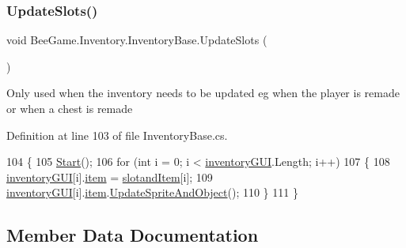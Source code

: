 \subsubsection{\texorpdfstring{Update\+Slots()}{UpdateSlots()}}
{\footnotesize\ttfamily void Bee\+Game.\+Inventory.\+Inventory\+Base.\+Update\+Slots (\begin{DoxyParamCaption}{ }\end{DoxyParamCaption})}



Only used when the inventory needs to be updated eg when the player is remade or when a chest is remade 



Definition at line 103 of file Inventory\+Base.\+cs.


\begin{DoxyCode}
104         \{
105             \hyperlink{class_bee_game_1_1_inventory_1_1_inventory_base_a22d2b2a1621c8cf19925692ac8cc5923}{Start}();
106             \textcolor{keywordflow}{for} (\textcolor{keywordtype}{int} i = 0; i < \hyperlink{class_bee_game_1_1_inventory_1_1_inventory_base_a48dcba7ad7bfa1bed8c9ae290fb32857}{inventoryGUI}.Length; i++)
107             \{
108                 \hyperlink{class_bee_game_1_1_inventory_1_1_inventory_base_a48dcba7ad7bfa1bed8c9ae290fb32857}{inventoryGUI}[i].\hyperlink{class_bee_game_1_1_inventory_1_1_inventory_slot_a31b201e7eef9ed0001a447b3f76a7a81}{item} = \hyperlink{class_bee_game_1_1_inventory_1_1_inventory_base_a405502a6eabf14e1498d96dc8aff5e8d}{slotandItem}[i];
109                 \hyperlink{class_bee_game_1_1_inventory_1_1_inventory_base_a48dcba7ad7bfa1bed8c9ae290fb32857}{inventoryGUI}[i].\hyperlink{class_bee_game_1_1_inventory_1_1_inventory_slot_a31b201e7eef9ed0001a447b3f76a7a81}{item}.\hyperlink{struct_bee_game_1_1_items_1_1_item_a29abdb5010a23262e7562720bb85c171}{UpdateSpriteAndObject}();
110             \}
111         \}
\end{DoxyCode}


\subsection{Member Data Documentation}
\mbox{\label{class_bee_game_1_1_inventory_1_1_inventory_base_aa018ec0acd2aa39dd922f0a1bc1411e6}} 
